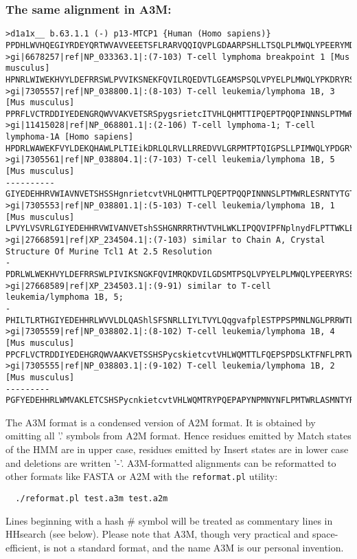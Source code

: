 \documentclass[11pt,a4paper]{article}
\begin{document}
\subsubsection*{The same alignment in A3M:}

\scriptsize\begin{verbatim}
>d1a1x__ b.63.1.1 (-) p13-MTCP1 {Human (Homo sapiens)}
PPDHLWVHQEGIYRDEYQRTWVAVVEEETSFLRARVQQIQVPLGDAARPSHLLTSQLPLMWQLYPEERYMDNNSR
>gi|6678257|ref|NP_033363.1|:(7-103) T-cell lymphoma breakpoint 1 [Mus musculus]
HPNRLWIWEKHVYLDEFRRSWLPVVIKSNEKFQVILRQEDVTLGEAMSPSQLVPYELPLMWQLYPKDRYRSCDSM
>gi|7305557|ref|NP_038800.1|:(8-103) T-cell leukemia/lymphoma 1B, 3 [Mus musculus]
PPRFLVCTRDDIYEDENGRQWVVAKVETSRSpygsrietcITVHLQHMTTIPQEPTPQQPINNNSLPTMWRLESMNTYTGTDGT
>gi|11415028|ref|NP_068801.1|:(2-106) T-cell lymphoma-1; T-cell lymphoma-1A [Homo sapiens]
HPDRLWAWEKFVYLDEKQHAWLPLTIEikDRLQLRVLLRREDVVLGRPMTPTQIGPSLLPIMWQLYPDGRYRSSDSS
>gi|7305561|ref|NP_038804.1|:(7-103) T-cell leukemia/lymphoma 1B, 5 [Mus musculus]
----------GIYEDEHHRVWIAVNVETSHSSHgnrietcvtVHLQHMTTLPQEPTPQQPINNNSLPTMWRLESRNTYTGTDGT
>gi|7305553|ref|NP_038801.1|:(5-103) T-cell leukemia/lymphoma 1B, 1 [Mus musculus]
LPVYLVSVRLGIYEDEHHRVWIVANVETshSSHGNRRRTHVTVHLWKLIPQQVIPFNplnydFLPTTWKLESRNIYWATDGT
>gi|27668591|ref|XP_234504.1|:(7-103) similar to Chain A, Crystal Structure Of Murine Tcl1 At 2.5 Resolution
-PDRLWLWEKHVYLDEFRRSWLPIVIKSNGKFQVIMRQKDVILGDSMTPSQLVPYELPLMWQLYPEERYRSSNSE
>gi|27668589|ref|XP_234503.1|:(9-91) similar to T-cell leukemia/lymphoma 1B, 5;
-PHILTLRTHGIYEDEHHRLWVVLDLQAShlSFSNRLLIYLTVYLQqgvafplESTPPSPMNLNGLPRRWTLRTMGTYEGTDNT
>gi|7305559|ref|NP_038802.1|:(8-102) T-cell leukemia/lymphoma 1B, 4 [Mus musculus] 
PPCFLVCTRDDIYEDEHGRQWVAAKVETSSHSPycskietcvtVHLWQMTTLFQEPSPDSLKTFNFLPRTWRLESRNTYRGADAM
>gi|7305555|ref|NP_038803.1|:(9-102) T-cell leukemia/lymphoma 1B, 2 [Mus musculus]
---------PGFYEDEHHRLWMVAKLETCSHSPycnkietcvtVHLWQMTRYPQEPAPYNPMNYNFLPMTWRLASMNTYRGTDAM
\end{verbatim}\normalsize

The A3M format is a condensed version of A2M format. It is obtained by omitting all '.' 
symbols from A2M format. Hence residues emitted by Match states of the HMM are in upper 
case, residues emitted by Insert states are in lower case and deletions are written '-'.
A3M-formatted alignments can be reformatted to other formats like FASTA or A2M with 
the \verb`reformat.pl` utility:
\begin{verbatim}
  ./reformat.pl test.a3m test.a2m
\end{verbatim}
Lines beginning with a hash \# symbol will be treated as commentary lines in HHsearch 
(see below). Please note that A3M, though very practical and space-efficient, 
is not a standard format, and the name A3M is our personal invention.
\end{document}
